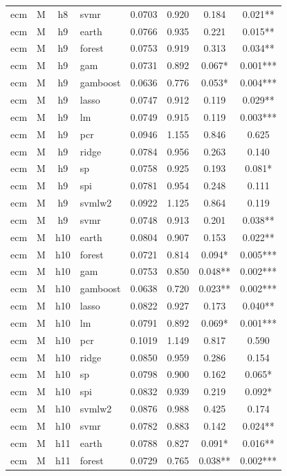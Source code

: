 \begin{ThreePartTable}
\begin{longtable}[t]{llclcccc}
ecm & M & h8 & svmr & 0.0703 & 0.920 & 0.184 & 0.021**\\
\addlinespace
ecm & M & h9 & earth & 0.0766 & 0.935 & 0.221 & 0.015**\\
ecm & M & h9 & forest & 0.0753 & 0.919 & 0.313 & 0.034**\\
ecm & M & h9 & gam & 0.0731 & 0.892 & 0.067* & 0.001***\\
ecm & M & h9 & gamboost & 0.0636 & 0.776 & 0.053* & 0.004***\\
ecm & M & h9 & lasso & 0.0747 & 0.912 & 0.119 & 0.029**\\
ecm & M & h9 & lm & 0.0749 & 0.915 & 0.119 & 0.003***\\
ecm & M & h9 & pcr & 0.0946 & 1.155 & 0.846 & 0.625\\
ecm & M & h9 & ridge & 0.0784 & 0.956 & 0.263 & 0.140\\
ecm & M & h9 & sp & 0.0758 & 0.925 & 0.193 & 0.081*\\
ecm & M & h9 & spi & 0.0781 & 0.954 & 0.248 & 0.111\\
ecm & M & h9 & svmlw2 & 0.0922 & 1.125 & 0.864 & 0.119\\
ecm & M & h9 & svmr & 0.0748 & 0.913 & 0.201 & 0.038**\\
\addlinespace
ecm & M & h10 & earth & 0.0804 & 0.907 & 0.153 & 0.022**\\
ecm & M & h10 & forest & 0.0721 & 0.814 & 0.094* & 0.005***\\
ecm & M & h10 & gam & 0.0753 & 0.850 & 0.048** & 0.002***\\
ecm & M & h10 & gamboost & 0.0638 & 0.720 & 0.023** & 0.002***\\
ecm & M & h10 & lasso & 0.0822 & 0.927 & 0.173 & 0.040**\\
ecm & M & h10 & lm & 0.0791 & 0.892 & 0.069* & 0.001***\\
ecm & M & h10 & pcr & 0.1019 & 1.149 & 0.817 & 0.590\\
ecm & M & h10 & ridge & 0.0850 & 0.959 & 0.286 & 0.154\\
ecm & M & h10 & sp & 0.0798 & 0.900 & 0.162 & 0.065*\\
ecm & M & h10 & spi & 0.0832 & 0.939 & 0.219 & 0.092*\\
ecm & M & h10 & svmlw2 & 0.0876 & 0.988 & 0.425 & 0.174\\
ecm & M & h10 & svmr & 0.0782 & 0.883 & 0.142 & 0.024**\\
\addlinespace
ecm & M & h11 & earth & 0.0788 & 0.827 & 0.091* & 0.016**\\
ecm & M & h11 & forest & 0.0729 & 0.765 & 0.038** & 0.002***\\

\end{longtable}
\end{ThreePartTable}
